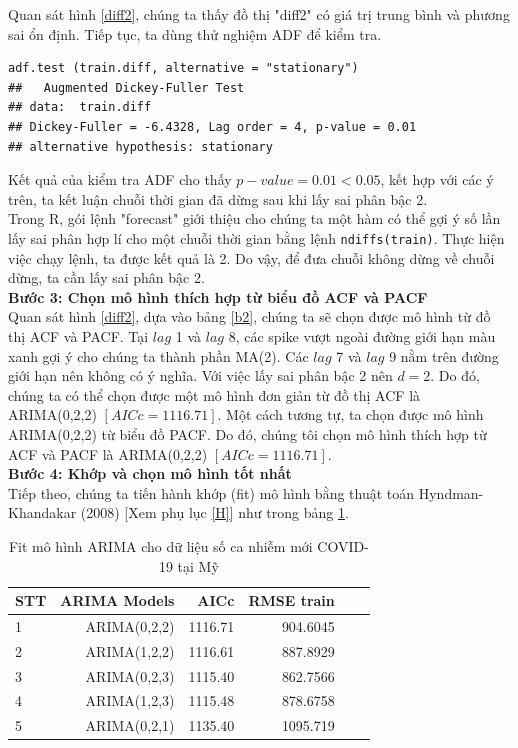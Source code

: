 \documentclass[12pt, a4paper,oneside]{book}
\theoremstyle{definition}
\begin{document}
Quan sát hình \ref{diff2}, chúng ta thấy đồ thị "diff2" có giá trị trung bình và phương sai ổn định. Tiếp tục, ta dùng thử nghiệm ADF để kiểm tra.
\begin{lstlisting}
adf.test (train.diff, alternative = "stationary")	
## 	 Augmented Dickey-Fuller Test
## data:  train.diff
## Dickey-Fuller = -6.4328, Lag order = 4, p-value = 0.01
## alternative hypothesis: stationary
\end{lstlisting}
Kết quả của kiểm tra ADF cho thấy $p-value = 0.01 < 0.05$, kết hợp với các ý trên, ta kết luận chuỗi thời gian đã dừng sau khi lấy sai phân bậc 2.\\
Trong R, gói lệnh "forecast" giới thiệu cho chúng ta một hàm có thể gợi ý số lần lấy sai phân hợp lí cho một chuỗi thời gian bằng lệnh \lstinline{ndiffs(train)}. Thực hiện việc chạy lệnh, ta được kết quả là 2. Do vậy, để đưa chuỗi không dừng về chuỗi dừng, ta cần lấy sai phân bậc 2.\\
\textbf{Bước 3: Chọn mô hình thích hợp từ biểu đồ ACF và PACF}\\
Quan sát hình \ref{diff2}, dựa vào bảng \ref{b2}, chúng ta sẽ chọn được mô hình từ đồ thị ACF và PACF. Tại $lag$ 1 và $lag$ 8, các spike vượt ngoài đường giới hạn màu xanh gợi ý cho chúng ta thành phần MA(2). Các $lag$ 7 và $lag$ 9 nằm trên đường giới hạn nên không có ý nghĩa. Với việc lấy sai phân bậc 2 nên $d = 2$. Do đó, chúng ta có thể chọn được một mô hình đơn giản từ đồ thị ACF là ARIMA(0,2,2) $[AICc= 1116.71]$. Một cách tương tự, ta chọn được mô hình ARIMA(0,2,2) từ biểu đồ PACF. Do đó, chúng tôi chọn mô hình thích hợp từ ACF và PACF là ARIMA(0,2,2) $[AICc=1116.71]$.\\
\textbf{Bước 4: Khớp và chọn mô hình tốt nhất}\\
Tiếp theo, chúng ta tiến hành khớp (fit) mô hình bằng thuật toán Hyndman-Khandakar (2008) [Xem phụ lục \ref{H}] như trong bảng \ref{b27}.
\begin{table}[!h]
	\caption{Fit mô hình ARIMA cho dữ liệu số ca nhiễm mới COVID-19 tại Mỹ}\label{b27}
	\centering
	\fontsize{6}{10}\selectfont
	\begin{tabular}[t]{lrrrrr}
		\toprule
		STT	& ARIMA Models & AICc & RMSE train\\
		\midrule
		\rowcolor{gray!6}  1 & ARIMA(0,2,2) & 1116.71 & 904.6045\\
		2 & ARIMA(1,2,2) & 1116.61 & 887.8929\\
		\rowcolor{gray!6}  3 & ARIMA(0,2,3) & 1115.40  & 862.7566\\
		4 & ARIMA(1,2,3) & 1115.48 & 878.6758\\
		\rowcolor{gray!6} 5  & ARIMA(0,2,1) & 1135.40 & 1095.719\\
		\bottomrule
	\end{tabular}
\end{table}
\end{document}
